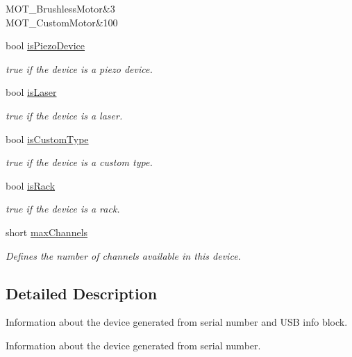 \begin{DoxyCompactItemize}
\begin{DoxyCompactList}
\begin{longtabu}
M\+O\+T\+\_\+\+Brushless\+Motor&3 \\
M\+O\+T\+\_\+\+Custom\+Motor&100 \\
\end{longtabu}
\end{DoxyCompactList}\item 
bool \hyperlink{struct_t_l_i___device_info_aaf0ff2a1be0eea8157894f9f2bfbc323}{is\+Piezo\+Device}
\begin{DoxyCompactList}\small\item\em {\ttfamily true} if the device is a piezo device. \end{DoxyCompactList}\item 
bool \hyperlink{struct_t_l_i___device_info_afb1c8b9fe2db839989f99d975ab83858}{is\+Laser}
\begin{DoxyCompactList}\small\item\em {\ttfamily true} if the device is a laser. \end{DoxyCompactList}\item 
bool \hyperlink{struct_t_l_i___device_info_a02a1fa0d7224a387b24757b754d6b880}{is\+Custom\+Type}
\begin{DoxyCompactList}\small\item\em {\ttfamily true} if the device is a custom type. \end{DoxyCompactList}\item 
bool \hyperlink{struct_t_l_i___device_info_a1473c581c566934b35fc56dc4699f975}{is\+Rack}
\begin{DoxyCompactList}\small\item\em {\ttfamily true} if the device is a rack. \end{DoxyCompactList}\item 
short \hyperlink{struct_t_l_i___device_info_a1f52f050d40870aa0cf566ce42774853}{max\+Channels}
\begin{DoxyCompactList}\small\item\em Defines the number of channels available in this device. \end{DoxyCompactList}\end{DoxyCompactItemize}


\subsection{Detailed Description}
Information about the device generated from serial number and U\+SB info block. 

Information about the device generated from serial number. 

